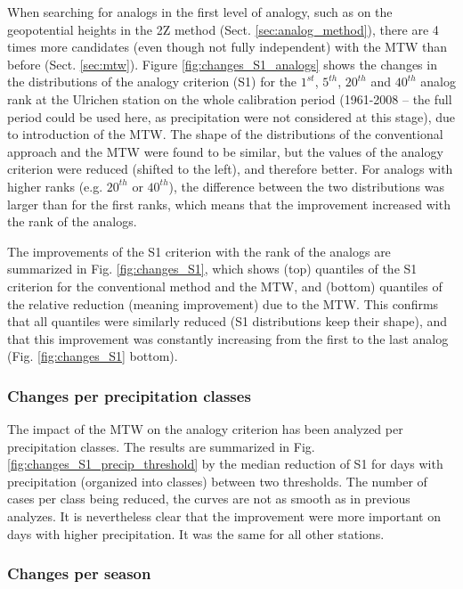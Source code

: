 \documentclass[hess, manuscript]{copernicus}
\begin{document}
When searching for analogs in the first level of analogy, such as on the geopotential heights in the 2Z method (Sect. \ref{sec:analog_method}), there are 4 times more candidates (even though not fully independent) with the MTW than before (Sect. \ref{sec:mtw}). Figure \ref{fig:changes_S1_analogs} shows the changes in the distributions of the analogy criterion (S1) for the $1^{st}$, $5^{th}$, $20^{th}$ and $40^{th}$ analog rank at the Ulrichen station on the whole calibration period (1961-2008 -- the full period could be used here, as precipitation were not considered at this stage), due to introduction of the MTW. The shape of the distributions of the conventional approach and the MTW were found to be similar, but the values of the analogy criterion were reduced (shifted to the left), and therefore better. For analogs with higher ranks (e.g. $20^{th}$ or $40^{th}$), the difference between the two distributions was larger than for the first ranks, which means that the improvement increased with the rank of the analogs. 

The improvements of the S1 criterion with the rank of the analogs are summarized in Fig. \ref{fig:changes_S1}, which shows (top) quantiles of the S1 criterion for the conventional method and the MTW, and (bottom) quantiles of the relative reduction (meaning improvement) due to the MTW. This confirms that all quantiles were similarly reduced (S1 distributions keep their shape), and that this improvement was constantly increasing from the first to the last analog (Fig. \ref{fig:changes_S1} bottom).


\subsubsection{Changes per precipitation classes}
\label{sec:influence_precip}

The impact of the MTW on the analogy criterion has been analyzed per precipitation classes. The results are summarized in Fig. \ref{fig:changes_S1_precip_threshold} by the median reduction of S1 for days with precipitation (organized into classes) between two thresholds. The number of cases per class being reduced, the curves are not as smooth as in previous analyzes. It is nevertheless clear that the improvement were more important on days with higher precipitation. It was the same for all other stations.


\subsubsection{Changes per season}
\label{sec:seasonal_effect}
\end{document}
